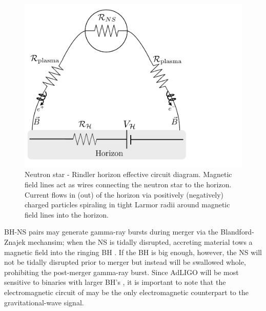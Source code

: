 \begin{figure}
\begin{center}
\includegraphics[scale=0.35]{figures/ch6/BHNS_CircuitDiagram.pdf} 
\end{center}
\caption{Neutron star - Rindler horizon effective circuit
  diagram. Magnetic field lines act as wires connecting the neutron
  star to the horizon. Current flows in (out) of the horizon via 
  positively (negatively) charged particles spiraling in tight Larmor radii around magnetic field lines into the horizon. }
\label{CircuitDiagram}
\end{figure}

BH-NS pairs may generate gamma-ray bursts
during merger via the Blandford-Znajek mechansim; 
when the NS is tidally disrupted, accreting
material tows a magnetic field into the ringing BH \citep{NPP:NSBH_GRB:1992, LeeRuiz:2005, FaberBaumgarte:2006, ShibataUryu:2007, ShibataTaniguchi:2008, Etienne:2009, Rezzolla:2011, Etienne:2012, EastPret:2012, Giacomazzo:2013}. 
If the BH is big enough, however, the NS will not be tidally
disrupted prior to merger but instead will be swallowed whole,
prohibiting the post-merger gamma-ray burst. 
Since AdLIGO will be most sensitive to binaries with larger BH's
\citep{AdLIGO:2010}, it is important to note that the electromagnetic circuit of 
\citep{McL:2011} may be the only electromagnetic counterpart to
the gravitational-wave signal.


